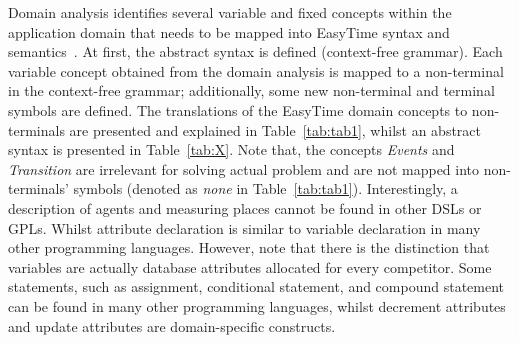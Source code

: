 \documentclass[preprint, prX]{revtex4}
\begin{document}
Domain analysis identifies several variable and fixed concepts within the application domain that needs to be mapped into EasyTime syntax and semantics~\cite{Mernik:2005}. At first, the abstract syntax is defined (context-free grammar). Each variable concept obtained from the domain
analysis is mapped to a non-terminal in the context-free grammar; additionally, some new non-terminal and terminal symbols are defined. The translations of the EasyTime domain concepts to non-terminals are presented and explained in Table~\ref{tab:tab1}, whilst an abstract syntax is presented in Table~\ref{tab:X}.
Note that, the concepts \textit{Events} and \textit{Transition} are irrelevant for solving actual problem and are not mapped into non-terminals' symbols (denoted as \textit{none} in Table~\ref{tab:tab1}).
Interestingly, a description of agents and measuring places cannot be found in other DSLs or GPLs.
Whilst attribute declaration is similar to variable declaration in many other programming languages.
However, note that there is the distinction that variables are actually database attributes allocated for every competitor. Some statements, such as assignment, conditional statement, and compound statement can be found in many other programming languages, whilst decrement attributes and update attributes are domain-specific constructs.
\end{document}

